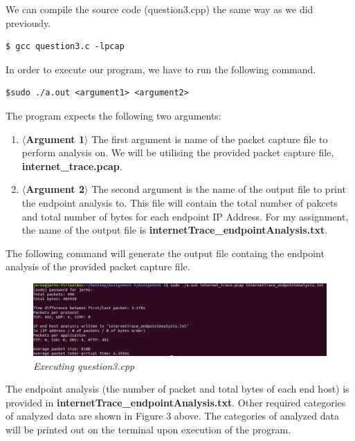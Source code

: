 \documentclass[a4paper,11pt]{article}
\begin{document}
We can compile the source code (question3.cpp) the same way as we did previously.
\begin{mdframed}[backgroundcolor=light-gray, roundcorner=30pt,leftmargin=1, rightmargin=1, innerleftmargin=5, innertopmargin=-3,innerbottommargin=5, outerlinewidth=1, linecolor=light-gray]
\begin{lstlisting}
$ gcc question3.c -lpcap
\end{lstlisting}
\end{mdframed}
In order to execute our program, we have to run the following command.
\begin{mdframed}[backgroundcolor=light-gray, roundcorner=30pt,leftmargin=1, rightmargin=1, innerleftmargin=5, innertopmargin=-3,innerbottommargin=5, outerlinewidth=1, linecolor=light-gray]
\begin{lstlisting}
$sudo ./a.out <argument1> <argument2>
\end{lstlisting}
\end{mdframed}
The program expects the following two arguments:
\begin{enumerate}
\item \textbf{$\langle$Argument 1$\rangle$}
\newline The first argument is name of the packet capture file to perform analysis on. We will be utilising the provided packet capture file, \textbf{internet\_trace.pcap}.
\item \textbf{$\langle$Argument 2$\rangle$}
\newline The second argument is the name of the output file to print the endpoint analysis to. This file will contain the total number of pakcets and total number of bytes for each endpoint IP Address. For my assignment, the name of the output file is \textbf{internetTrace\_endpointAnalysis.txt}.
\end{enumerate}
The following command will generate the output file containg the endpoint analysis of the provided packet capture file.
\newline
\begin{figure}[h!]
	\includegraphics[width = 16cm]{question3}
	\caption{\textit{Executing question3.cpp}}
\end{figure}
\newline
The endpoint analysis (the number of packet and total bytes of each end host) is provided in \textbf{internetTrace\_endpointAnalysis.txt}. Other required categories of analyzed data are shown in Figure 3 above. The categories of analyzed data will be printed out on the terminal upon execution of the program.
\end{document}
